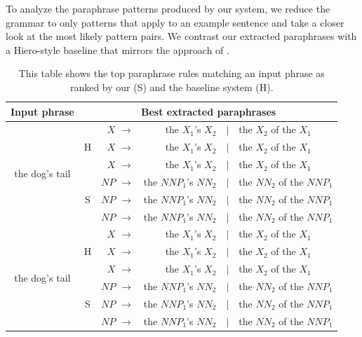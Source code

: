 \documentclass[11pt]{article}
\begin{document}
To analyze the paraphrase patterns produced by our system, we reduce
the grammar to only patterns that apply to an example sentence and
take a closer look at the most likely pattern pairs. We contrast our
extracted paraphrases with a Hiero-style baseline that mirrors the
approach of . 

\begin{table}[t]
\begin{center}
\begin{tabular}{|c|c|rrcl|}
  \hline
  Input phrase & \multicolumn{5}{c|}{Best extracted paraphrases} \\
  \hline
  \multirow{6}{*}{the dog's tail} &
  \multirow{3}{*}{H}
  &
  $\mathit{X}$ $\rightarrow$  & the $\mathit{X}_1$'s
  $\mathit{X}_2$ & $\mid$ & the $\mathit{X}_2$ of the $\mathit{X}_1$
  \\
  &&
  $\mathit{X}$ $\rightarrow$  & the $\mathit{X}_1$'s
  $\mathit{X}_2$ & $\mid$ & the $\mathit{X}_2$ of the $\mathit{X}_1$
  \\
  &&
  $\mathit{X}$ $\rightarrow$  & the $\mathit{X}_1$'s
  $\mathit{X}_2$ & $\mid$ & the $\mathit{X}_2$ of the $\mathit{X}_1$ \\
  \cline{2-6}
  & \multirow{3}{*}{S}
  &
  $\mathit{NP}$ $\rightarrow$  & the $\mathit{NNP}_1$'s
  $\mathit{NN}_2$ & $\mid$ & the $\mathit{NN}_2$ of the $\mathit{NNP}_1$
  \\
  &&
  $\mathit{NP}$ $\rightarrow$  & the $\mathit{NNP}_1$'s
  $\mathit{NN}_2$ & $\mid$ & the $\mathit{NN}_2$ of the $\mathit{NNP}_1$
  \\
  &&
  $\mathit{NP}$ $\rightarrow$  & the $\mathit{NNP}_1$'s
  $\mathit{NN}_2$ & $\mid$ & the $\mathit{NN}_2$ of the
  $\mathit{NNP}_1$ \\
  \hline
  \multirow{6}{*}{the dog's tail} &
  \multirow{3}{*}{H}
  &
  $\mathit{X}$ $\rightarrow$  & the $\mathit{X}_1$'s
  $\mathit{X}_2$ & $\mid$ & the $\mathit{X}_2$ of the $\mathit{X}_1$
  \\
  &&
  $\mathit{X}$ $\rightarrow$  & the $\mathit{X}_1$'s
  $\mathit{X}_2$ & $\mid$ & the $\mathit{X}_2$ of the $\mathit{X}_1$  \\
  &&
  $\mathit{X}$ $\rightarrow$  & the $\mathit{X}_1$'s
  $\mathit{X}_2$ & $\mid$ & the $\mathit{X}_2$ of the $\mathit{X}_1$
  \\
  \cline{2-6}
  & \multirow{3}{*}{S}
  &
  $\mathit{NP}$ $\rightarrow$  & the $\mathit{NNP}_1$'s
  $\mathit{NN}_2$ & $\mid$ & the $\mathit{NN}_2$ of the $\mathit{NNP}_1$
  \\
  &&
  $\mathit{NP}$ $\rightarrow$  & the $\mathit{NNP}_1$'s
  $\mathit{NN}_2$ & $\mid$ & the $\mathit{NN}_2$ of the $\mathit{NNP}_1$
  \\
  &&
  $\mathit{NP}$ $\rightarrow$  & the $\mathit{NNP}_1$'s
  $\mathit{NN}_2$ & $\mid$ & the $\mathit{NN}_2$ of the
  $\mathit{NNP}_1$ \\
  \hline
\end{tabular}
\end{center}
\caption{This table shows the top paraphrase rules matching an input
  phrase as ranked by our (S) and the baseline system (H).}
\end{table}
\end{document}
